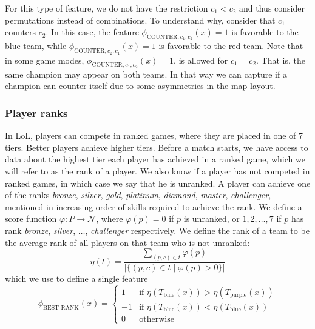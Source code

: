For this type of feature, we do not have the restriction $c_1 < c_2$ and thus consider permutations instead of combinations.
To understand why, consider that $c_1$ counters $c_2$.
In this case, the feature $\phi_{\text{COUNTER},c_1,c_2}(x) = 1$ is favorable to the blue team, while $\phi_{\text{COUNTER},c_2,c_1}(x) = 1$ is favorable to the red team.
Note that in some game modes, $\phi_{\text{COUNTER},c_1,c_2}(x) = 1$, is allowed for $c_1 = c_2$. That is, the same champion may appear on both teams.
In that way we can capture if a champion can counter itself due to some asymmetries in the map layout.

\subsubsection{Player ranks}
In LoL, players can compete in ranked games, where they are placed in one of 7 tiers. Better players achieve higher tiers.
Before a match starts, we have access to data about the highest tier each player has achieved in a ranked game, which we will refer to as the rank of a player. We also know if a player has not competed in ranked games, in which case we say that he is unranked.
A player can achieve one of the ranks \textit{bronze}, \textit{silver}, \textit{gold}, \textit{platinum}, \textit{diamond}, \textit{master}, \textit{challenger}, mentioned in increasing order of skills required to achieve the rank.
We define a score function $\varphi : P \rightarrow \mathcal{N}$, where $\varphi(p) = 0$ if $p$ is unranked, or $1, 2, \dots, 7$ if $p$ has rank \textit{bronze}, \textit{silver}, $\dots$, \textit{challenger} respectively.
We define the rank of a team to be the average rank of all players on that team who is not unranked:
\begin{equation}\label{eq:eta}
\eta(t) = \frac{\sum\limits_{(p, c) \in t} \varphi(p)}{|\{(p, c) \in t \mid \varphi(p) > 0\}|}
\end{equation}
which we use to define a single feature
\begin{equation}\label{eq:bestrank}
\phi_\text{BEST-RANK}(x) = 
\begin{cases} 
  1 & \text{if } \eta(T_\text{blue}(x)) > \eta(T_\text{purple}(x))\\
  -1 & \text{if } \eta(T_\text{blue}(x)) < \eta(T_\text{blue}(x))\\
  0 & \text{otherwise} 
\end{cases}  
\end{equation}

